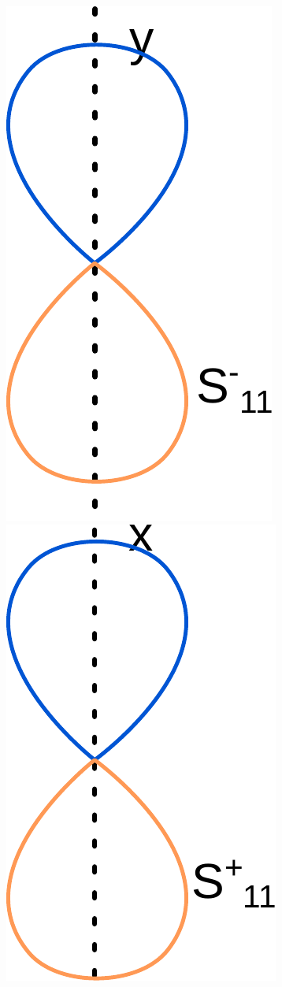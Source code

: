 \documentclass[french]{yLectureNote}
\begin{document}
\includegraphics[scale=0.3]{s-11}
\includegraphics[scale=0.3]{s+11}
\end{document}
